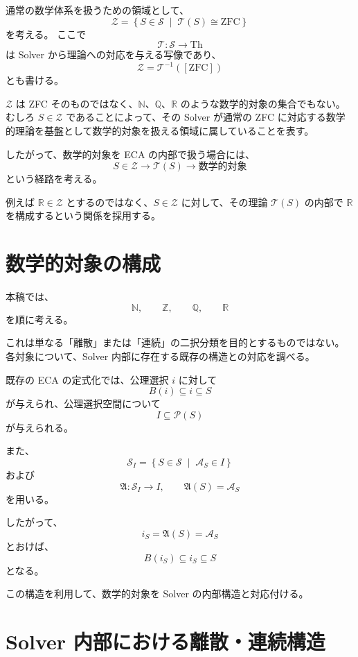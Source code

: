 \documentclass[a4paper,11pt]{article}
\begin{document}
通常の数学体系を扱うための領域として、
\[
\boxed{
\mathcal{Z}
=
\left\{
S\in\mathcal{S}
\;\middle|\;
\mathcal{T}(S)\cong\mathrm{ZFC}
\right\}}
\]
を考える。
ここで
\[
\mathcal{T}:\mathcal{S}\longrightarrow\mathrm{Th}
\]
は Solver から理論への対応を与える写像であり、
\[
\mathcal{Z}=\mathcal{T}^{-1}([\mathrm{ZFC}])
\]
とも書ける。

$\mathcal{Z}$ は ZFC そのものではなく、$\mathbb{N}$、$\mathbb{Q}$、$\mathbb{R}$ のような数学的対象の集合でもない。
むしろ $S\in\mathcal{Z}$ であることによって、その Solver が通常の ZFC に対応する数学的理論を基盤として数学的対象を扱える領域に属していることを表す。

したがって、数学的対象を ECA の内部で扱う場合には、
\[
\boxed{
S\in\mathcal{Z}
\longrightarrow
\mathcal{T}(S)
\longrightarrow
\text{数学的対象}}
\]
という経路を考える。

例えば $\mathbb{R}\in\mathcal{Z}$ とするのではなく、$S\in\mathcal{Z}$ に対して、その理論 $\mathcal{T}(S)$ の内部で $\mathbb{R}$ を構成するという関係を採用する。

\section{数学的対象の構成}
\label{sec:construction}

本稿では、
\[
\mathbb{N},\qquad
\mathbb{Z},\qquad
\mathbb{Q},\qquad
\mathbb{R}
\]
を順に考える。

これは単なる「離散」または「連続」の二択分類を目的とするものではない。
各対象について、Solver 内部に存在する既存の構造との対応を調べる。

既存の ECA の定式化では、公理選択 $i$ に対して
\[
B(i)\subseteq i\subseteq S
\]
が与えられ、公理選択空間について
\[
I\subseteq\mathcal{P}(S)
\]
が与えられる。

また、
\[
\mathcal{S}_I
=
\left\{
S\in\mathcal{S}
\;\middle|\;
\mathcal{A}_S\in I
\right\}
\]
および
\[
\mathfrak{A}:\mathcal{S}_I\longrightarrow I,
\qquad
\mathfrak{A}(S)=\mathcal{A}_S
\]
を用いる。

したがって、
\[
i_S=\mathfrak{A}(S)=\mathcal{A}_S
\]
とおけば、
\[
B(i_S)\subseteq i_S\subseteq S
\]
となる。

この構造を利用して、数学的対象を Solver の内部構造と対応付ける。

\section{Solver 内部における離散・連続構造}
\label{sec:discrete-continuous}
\end{document}
